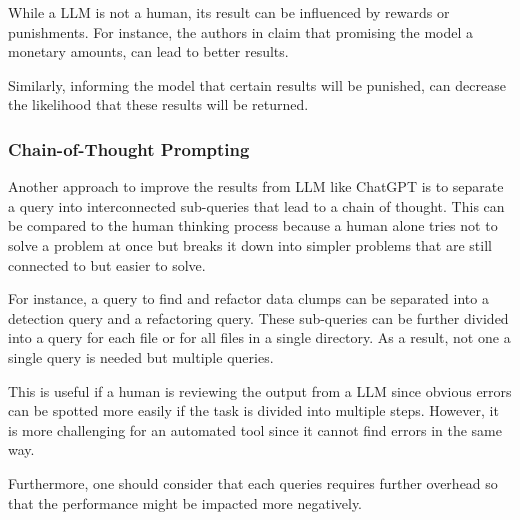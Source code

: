 While a \ac{LLM} is not a human, its result can be influenced by rewards or punishments. For instance, the authors in \cite{bsharat2023principled} claim that promising the model a monetary amounts, can lead to better results. 

Similarly, informing the model that certain results will be punished, can decrease the likelihood that these results will be returned. \cite{bsharat2023principled}

\subsubsection{Chain-of-Thought Prompting}\label{sec:chain of thought}

Another approach to improve the results from \ac{LLM} like ChatGPT is to separate a query into interconnected sub-queries that lead to a chain of thought. This can be compared to the human thinking process because a human alone tries not to solve a problem at once but breaks it down into simpler problems that are still connected to but easier to solve. \cite{Wei2022ChainOT}

For instance, a query to find and refactor data clumps can be separated into a detection query and a refactoring query. These sub-queries can be further divided into a query for each file or for all files in a single directory. As a result, not one a single query is needed but multiple queries. 

This is useful if a human is reviewing the output from a \ac{LLM} since obvious errors can be spotted more easily if the task is divided into multiple steps. However, it is more challenging for an automated tool since it cannot find errors in the same way. 

Furthermore, one should consider that each queries requires further overhead so that the performance might be impacted more negatively. 
